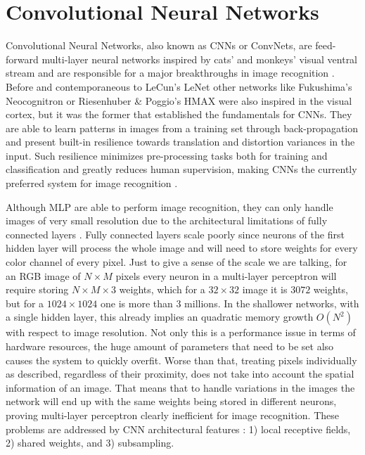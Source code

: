 \section{Convolutional Neural Networks}
\label{sec:theory:convnets}
Convolutional Neural Networks, also known as CNNs or ConvNets, are feed-forward multi-layer neural networks inspired by cats' and monkeys' visual ventral stream \cite{Hubel1968,Lawrence1997} and are responsible for a major breakthroughs in image recognition \cite{LeCun1995}.
Before and contemporaneous to LeCun's LeNet \cite{LeCun1998} other networks like Fukushima's Neocognitron \cite{Fukushima1980} or Riesenhuber \& Poggio's HMAX \cite{Riesenhuber1999} were also inspired in the visual cortex, but it was the former that established the fundamentals for CNNs.
They are able to learn patterns in images from a training set through back-propagation and present built-in resilience towards translation and distortion variances in the input.
Such resilience minimizes pre-processing tasks both for training and classification and greatly reduces human supervision, making CNNs the currently preferred system for image recognition \cite{Visin2015}.

Although MLP are able to perform image recognition, they can only handle images of very small resolution due to the architectural limitations of fully connected layers \cite{ZHANG1999}.
Fully connected layers scale poorly since neurons of the first hidden layer will process the whole image and will need to store weights for every color channel of every pixel.
Just to give a sense of the scale we are talking, for an RGB image of ${N}\times{M}$ pixels every neuron in a multi-layer perceptron will require storing ${N}\times{M}\times{3}$ weights, which for a ${32}\times{32}$ image it is $3072$ weights, but for a ${1024}\times{1024}$ one is more than $3$ millions.
In the shallower networks, with a single hidden layer, this already implies an quadratic memory growth $O(N^2)$ with respect to image resolution.
Not only this is a performance issue in terms of hardware resources, the huge amount of parameters that need to be set also causes the system to quickly overfit.
Worse than that, treating pixels individually as described, regardless of their proximity, does not take into account the spatial information of an image.
That means that to handle variations in the images the network will end up with the same weights being stored in different neurons, proving multi-layer perceptron clearly inefficient for image recognition.
These problems are addressed by CNN architectural features \cite{LeCun1998}: 1) local receptive fields, 2) shared weights, and 3) subsampling.


